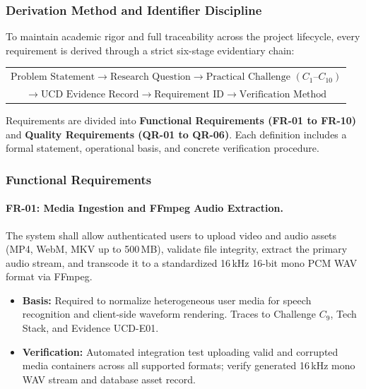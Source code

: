 \documentclass[a4paper,11pt]{article}
\begin{document}
\subsubsection{Derivation Method and Identifier Discipline}
\label{sec:chap3_req_method}
To maintain academic rigor and full traceability across the project lifecycle, every requirement is derived through a strict six-stage evidentiary chain:
\begin{center}
\small
\begin{tabular}{@{}c@{}}
\footnotesize $\text{Problem Statement} \rightarrow \text{Research Question} \rightarrow \text{Practical Challenge } (C_1\text{--}C_{10})$\\
\footnotesize $\rightarrow \text{UCD Evidence Record} \rightarrow \text{Requirement ID} \rightarrow \text{Verification Method}$
\end{tabular}
\end{center}
Requirements are divided into \textbf{Functional Requirements (FR-01 to FR-10)} and \textbf{Quality Requirements (QR-01 to QR-06)}. Each definition includes a formal statement, operational basis, and concrete verification procedure.

\subsubsection{Functional Requirements}
\label{sec:chap3_req_fr}

\paragraph{FR-01: Media Ingestion and FFmpeg Audio Extraction.}
The system shall allow authenticated users to upload video and audio assets (MP4, WebM, MKV up to 500\,MB), validate file integrity, extract the primary audio stream, and transcode it to a standardized 16\,kHz 16-bit mono PCM WAV format via FFmpeg.
\begin{itemize}
    \item \textbf{Basis:} Required to normalize heterogeneous user media for speech recognition and client-side waveform rendering. Traces to Challenge $C_9$, Tech Stack, and Evidence UCD-E01.
    \item \textbf{Verification:} Automated integration test uploading valid and corrupted media containers across all supported formats; verify generated 16\,kHz mono WAV stream and database asset record.
\end{itemize}
\end{document}
